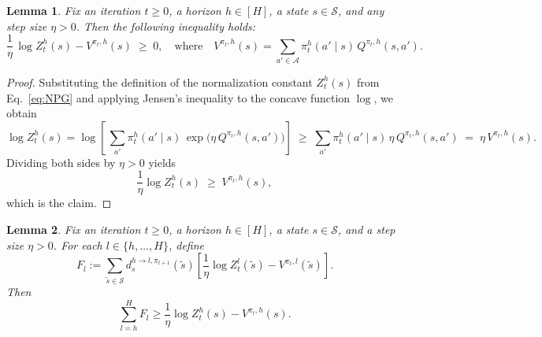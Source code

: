 \documentclass[11pt]{article}
\newtheorem{lem}{Lemma}
\begin{document}
\begin{lem}\label{lemma:logZi}
Fix an iteration $t\ge 0$, a horizon $h\in[H]$, a state $s\in\mathcal S$, and any step size $\eta>0$. Then the following inequality holds:
\[
\frac{1}{\eta}\,\log Z_t^h(s) - V^{\pi_t,h}(s) \;\geq\; 0,
\quad\text{where}\quad
V^{\pi_t,h}(s)=\sum_{a'\in\mathcal A}\pi_t^h(a'\mid s)\,Q^{\pi_t,h}(s,a').
\]
\end{lem}
\begin{proof}
Substituting the definition of the normalization constant $Z_t^h(s)$ from Eq.~\eqref{eq:NPG} and applying Jensen's inequality to the concave function $\log$, we obtain
\[
\log Z^h_t(s)
=\log\!\left[\,\sum_{a'} \pi^h_t(a'\mid s)\,\exp\!\big(\eta\, Q^{\pi_t,h}(s,a')\big)\right]
\;\geq\; \sum_{a'} \pi^h_t(a'\mid s)\,\eta\, Q^{\pi_t,h}(s,a')
\;=\; \eta\, V^{\pi_t,h}(s).
\]
Dividing both sides by $\eta>0$ yields
\[
\frac{1}{\eta}\log Z^h_t(s) \;\geq\; V^{\pi_t,h}(s),
\]
which is the claim.
\end{proof} 
\begin{lem} \label{lem:L}
Fix an iteration $t\ge0$, a horizon $h\in[H]$, a state $s\in\mathcal S$, and a step size
$\eta>0$. For each $l\in\{h,\ldots,H\}$, define
\[
F_l
:=
\sum_{\tilde s\in\mathcal S}
d_s^{h\to l,\pi_{t+1}}(\tilde s)
\left[
\frac{1}{\eta}\log Z_t^l(\tilde s)-V^{\pi_t,l}(\tilde s)
\right].
\]
Then
\[
\sum_{l=h}^H F_l
\ge
\frac{1}{\eta}\log Z_t^h(s)-V^{\pi_t,h}(s).
\]
\end{lem}
\end{document}
